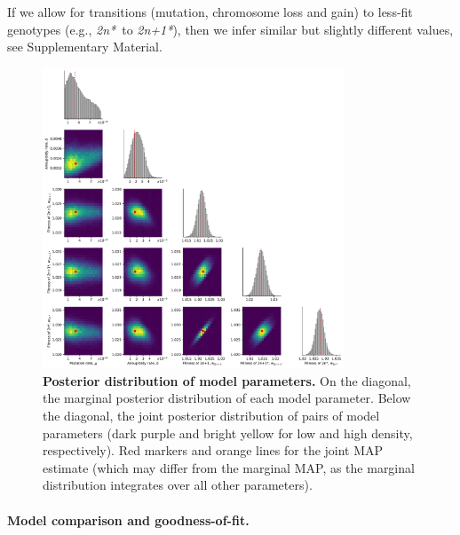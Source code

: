 \documentclass[12pt]{extarticle}
\newcommand{\eumt}{\emph{2n*}}
\newcommand{\anmt}{\emph{2n+1*}}
\begin{document}
If we allow for transitions (mutation, chromosome loss and gain) to less-fit genotypes (e.g., \eumt\ to \anmt), then we infer similar but slightly different values, see Supplementary Material.

\begin{figure}[h]
  \centering
\includegraphics[width=0.8\textwidth]{../figures/posterior.pdf}
  \caption{
  \textbf{Posterior distribution of model parameters.}
On the diagonal, the marginal posterior distribution of each model parameter. 
Below the diagonal, the joint posterior distribution of pairs of model parameters (dark purple and bright yellow for low and high density, respectively). Red markers and orange lines for the joint MAP estimate (which may differ from the marginal MAP, as the marginal distribution integrates over all other parameters).
} 
  \label{fig:posterior}
\end{figure}

\paragraph{Model comparison and goodness-of-fit.}
\end{document}
